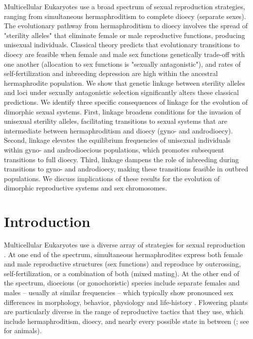 \documentclass{article}
\newcommand\hl[1]{%
  \bgroup
  \hskip0pt\color{blue!80!black}%
  #1%
  \egroup
}
\begin{document}
\noindent{} Multicellular Eukaryotes use a broad spectrum of sexual reproduction strategies, ranging from simultaneous hermaphroditism to complete dioecy (separate sexes). The evolutionary pathway from hermaphroditism to dioecy involves the spread of "sterility alleles" that eliminate female or male reproductive functions, producing unisexual individuals. Classical theory predicts that evolutionary transitions to dioecy are feasible when female and male sex functions genetically trade-off with one another (allocation to sex functions is "sexually antagonistic"), and rates of self-fertilization and inbreeding depression are high within the ancestral hermaphrodite population. We show that \hl{genetic} linkage between sterility alleles and loci under sexually antagonistic selection significantly alters these classical predictions. We identify three specific consequences of linkage for the evolution of dimorphic sexual systems. First, linkage broadens conditions for the invasion of unisexual sterility alleles, facilitating transitions to sexual systems that are intermediate between hermaphroditism and dioecy (gyno- and androdioecy). Second, linkage elevates the equilibrium frequencies of unisexual individuals within gyno- and androdioecious populations, which promotes subsequent transitions to full dioecy. Third, linkage dampens the role of inbreeding during transitions to gyno- and androdioecy, making \hl{these transitions} feasible in outbred populations. We discuss implications of these results for the evolution of \hl{dimorphic} reproductive systems and sex chromosomes.
\newpage{}


\section*{Introduction} \label{sec:Introduction}
Multicellular Eukaryotes use a diverse array of strategies for sexual reproduction \citep{Bachtrog2014}. At one end of the spectrum, simultaneous hermaphrodites express both female and male reproductive structures (sex functions) and reproduce by outcrossing, self-fertilization, or a combination of both (mixed mating). \hl{At the other end of the spectrum, dioecious (or gonochoristic) species include separate females and males -- usually at similar frequencies -- which typically show pronounced sex differences in morphology, behavior, physiology and life-history} \citep{Andersson1994}. Flowering plants are particularly diverse in the range of reproductive tactics that they use, which include hermaphroditism, dioecy, and nearly every possible state in between (\citealt{Darwin1877, Westergaard1958, Bawa1980, SakaiWeller1999, Barrett2010, Renner2014, Bachtrog2014}; see \citealt{JarneAuld2006} for animals). 
\end{document}
